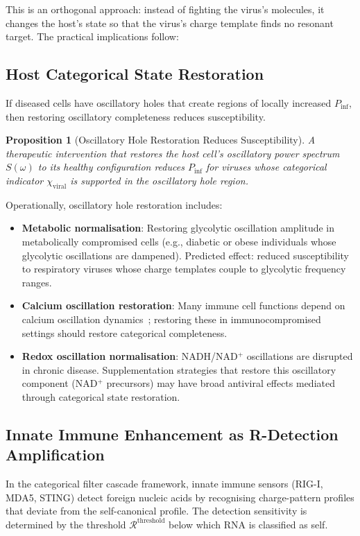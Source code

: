\documentclass[12pt,a4paper]{article}
\newtheorem{proposition}[theorem]{Proposition}
\theoremstyle{definition}
\theoremstyle{remark}
\newcommand{\Rcat}{\mathcal{R}}
\newcommand{\chiviral}{\chi_{\mathrm{viral}}}
\begin{document}
This is an orthogonal approach: instead of fighting the virus's molecules, it changes the host's state so that the virus's charge template finds no resonant target. The practical implications follow:

\subsection{Host Categorical State Restoration}

If diseased cells have oscillatory holes that create regions of locally increased $P_{\mathrm{inf}}$, then restoring oscillatory completeness reduces susceptibility.

\begin{proposition}[Oscillatory Hole Restoration Reduces Susceptibility]
A therapeutic intervention that restores the host cell's oscillatory power spectrum $S(\omega)$ to its healthy configuration reduces $P_{\mathrm{inf}}$ for viruses whose categorical indicator $\chiviral$ is supported in the oscillatory hole region.
\end{proposition}

Operationally, oscillatory hole restoration includes:
\begin{itemize}
  \item \textbf{Metabolic normalisation}: Restoring glycolytic oscillation amplitude in metabolically compromised cells (e.g., diabetic or obese individuals whose glycolytic oscillations are dampened). Predicted effect: reduced susceptibility to respiratory viruses whose charge templates couple to glycolytic frequency ranges.
  \item \textbf{Calcium oscillation restoration}: Many immune cell functions depend on calcium oscillation dynamics~\cite{Berridge1997}; restoring these in immunocompromised settings should restore categorical completeness.
  \item \textbf{Redox oscillation normalisation}: NADH/NAD$^+$ oscillations are disrupted in chronic disease. Supplementation strategies that restore this oscillatory component (NAD$^+$ precursors) may have broad antiviral effects mediated through categorical state restoration.
\end{itemize}

\subsection{Innate Immune Enhancement as R-Detection Amplification}

In the categorical filter cascade framework, innate immune sensors (RIG-I, MDA5, STING) detect foreign nucleic acids by recognising charge-pattern profiles that deviate from the self-canonical profile. The detection sensitivity is determined by the threshold $\Rcat^{\mathrm{threshold}}$ below which RNA is classified as self.
\end{document}
